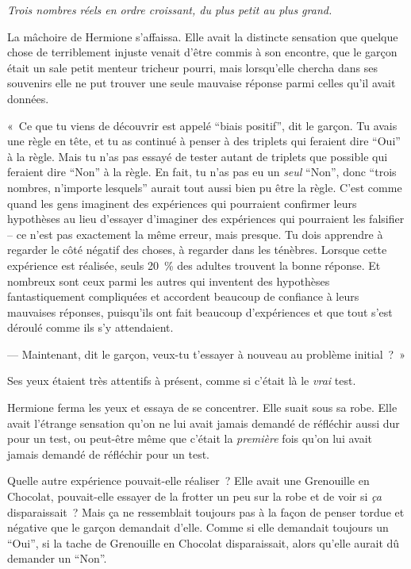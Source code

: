 \emph{Trois nombres réels en ordre croissant, du plus petit au plus grand.}

La mâchoire de Hermione s'affaissa. Elle avait la distincte sensation que quelque chose de terriblement injuste venait d'être commis à son encontre, que le garçon était un sale petit menteur tricheur pourri, mais lorsqu'elle chercha dans ses souvenirs elle ne put trouver une seule mauvaise réponse parmi celles qu'il avait données.

«~Ce que tu viens de découvrir est appelé “biais positif”, dit le garçon. Tu avais une règle en tête, et tu as continué à penser à des triplets qui feraient dire “Oui” à la règle. Mais tu n'as pas essayé de tester autant de triplets que possible qui feraient dire “Non” à la règle. En fait, tu n'as pas eu un \emph{seul} “Non”, donc “trois nombres, n'importe lesquels” aurait tout aussi bien pu être la règle. C'est comme quand les gens imaginent des expériences qui pourraient confirmer leurs hypothèses au lieu d'essayer d'imaginer des expériences qui pourraient les falsifier -- ce n'est pas exactement la même erreur, mais presque. Tu dois apprendre à regarder le côté négatif des choses, à regarder dans les ténèbres. Lorsque cette expérience est réalisée, seuls 20~\% des adultes trouvent la bonne réponse. Et nombreux sont ceux parmi les autres qui inventent des hypothèses fantastiquement compliquées et accordent beaucoup de confiance à leurs mauvaises réponses, puisqu'ils ont fait beaucoup d'expériences et que tout s'est déroulé comme ils s'y attendaient.

--- Maintenant, dit le garçon, veux-tu t'essayer à nouveau au problème initial~?~»

Ses yeux étaient très attentifs à présent, comme si c'était là le \emph{vrai} test.

Hermione ferma les yeux et essaya de se concentrer. Elle suait sous sa robe. Elle avait l'étrange sensation qu'on ne lui avait jamais demandé de réfléchir aussi dur pour un test, ou peut-être même que c'était la \emph{première} fois qu'on lui avait jamais demandé de réfléchir pour un test.

Quelle autre expérience pouvait-elle réaliser~? Elle avait une Grenouille en Chocolat, pouvait-elle essayer de la frotter un peu sur la robe et de voir si \emph{ça} disparaissait~? Mais ça ne ressemblait toujours pas à la façon de penser tordue et négative que le garçon demandait d'elle. Comme si elle demandait toujours un “Oui”, si la tache de Grenouille en Chocolat disparaissait, alors qu'elle aurait dû demander un “Non”.

